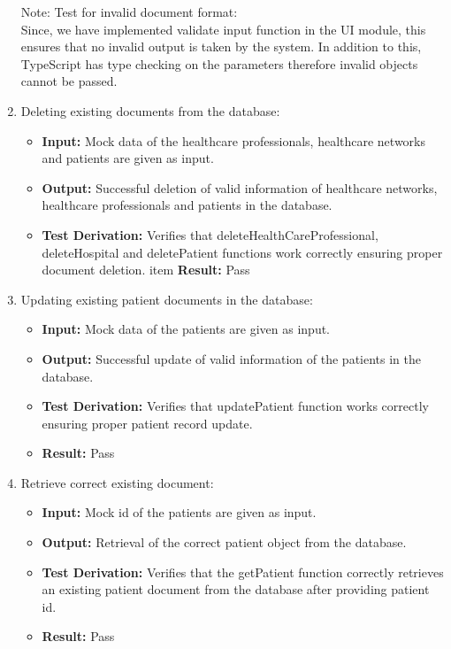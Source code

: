 \documentclass[12pt, titlepage]{article}
\begin{document}
\begin{enumerate}
      Note: Test for invalid document format: \\
      Since, we have implemented validate input function in the UI module, this ensures that no invalid output is taken by the system. In addition to this, TypeScript has type checking on the parameters therefore invalid objects cannot be passed.

    \item Deleting existing documents from the database:
      \begin{itemize}
        \item \textbf{Input:} Mock data of the healthcare professionals, healthcare networks and patients are given as input.  
        \item \textbf{Output:} Successful deletion of valid information of healthcare networks, healthcare professionals and patients in the database. 
        \item \textbf{Test Derivation:} Verifies that deleteHealthCareProfessional, deleteHospital and deletePatient functions work correctly ensuring proper document deletion.
        item \textbf{Result:} Pass
      \end{itemize}

    \item Updating existing patient documents in the database:
      \begin{itemize}
        \item \textbf{Input:} Mock data of the patients are given as input.  
        \item \textbf{Output:} Successful update of valid information of the patients in the database. 
        \item \textbf{Test Derivation:} Verifies that updatePatient function works correctly ensuring proper patient record update.
        \item \textbf{Result:} Pass
      \end{itemize}

    \item Retrieve correct existing document:
      \begin{itemize}
        \item \textbf{Input:} Mock id of the patients are given as input.  
        \item \textbf{Output:} Retrieval of the correct patient object from the database. 
        \item \textbf{Test Derivation:} Verifies that the getPatient function correctly retrieves an existing patient document from the database after providing patient id.
        \item \textbf{Result:} Pass
      \end{itemize}


\end{enumerate}
\end{document}
